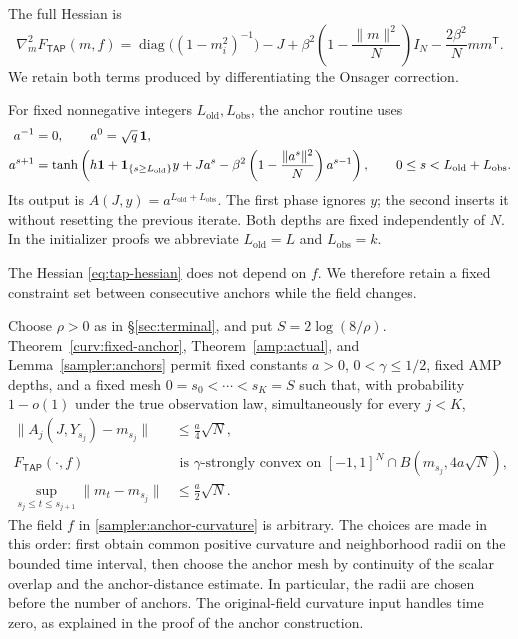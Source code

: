 \documentclass[11pt,reqno]{amsart}
\def\tap{{\mathsf{TAP}}}
\begin{document}
The full Hessian is
\begin{equation}\label{eq:tap-hessian}
 \nabla_m^2 F_{\tap}(m,f)
 =\operatorname{diag}\bigl((1-m_i^2)^{-1}\bigr)-J
  +\beta^2\left(1-\frac{\|m\|^2}{N}\right)I_N
  -\frac{2\beta^2}{N}mm^{\mathsf T}.
\end{equation}
We retain both terms produced by differentiating the Onsager correction.

For fixed nonnegative integers $L_{\mathrm{old}},L_{\mathrm{obs}}$, the anchor routine uses
\begin{equation}\label{amp:two-phase}
\begin{split}
 a^{-1}&=0,\qquad a^0=\sqrt q\,{\boldsymbol{1}},\\
 a^{s+1}&=\tanh\left(h{\boldsymbol{1}}+\mathbf1_{\{s\ge L_{\mathrm{old}}\}}y
 +Ja^s-\beta^2\left(1-\frac{\|a^s\|^2}{N}\right)a^{s-1}\right),
 \qquad 0\le s<L_{\mathrm{old}}+L_{\mathrm{obs}}.
\end{split}
\end{equation}
Its output is $A(J,y)=a^{L_{\mathrm{old}}+L_{\mathrm{obs}}}$. The first phase ignores $y$; the second inserts it without resetting the previous iterate. Both depths are fixed independently of $N$. In the initializer proofs we abbreviate $L_{\mathrm{old}}=L$ and $L_{\mathrm{obs}}=k$.

The Hessian \eqref{eq:tap-hessian} does not depend on $f$. We therefore retain a fixed
constraint set between consecutive anchors while the field changes.

Choose $\rho>0$ as in \S\ref{sec:terminal}, and put
$S=2\log(8/\rho)$. Theorem~\ref{curv:fixed-anchor},
Theorem~\ref{amp:actual}, and Lemma~\ref{sampler:anchors} permit fixed
constants $a>0$, $0<\gamma\le1/2$, fixed AMP depths, and a fixed
mesh $0=s_0<\cdots<s_K=S$ such that, with probability $1-o(1)$ under
the true observation law, simultaneously for every $j<K$,
\begin{align}
 \|A_j(J,Y_{s_j})-m_{s_j}\|&\le\tfrac a4\sqrt N,
       \label{sampler:anchor-accuracy}\\
  F_{\tap}(\cdot,f)&\text{ is $\gamma$-strongly convex on }
       [-1,1]^N\cap B(m_{s_j},4a\sqrt N),
       \label{sampler:anchor-curvature}\\
 \sup_{s_j\le t\le s_{j+1}}\|m_t-m_{s_j}\|
       &\le\tfrac a2\sqrt N.
       \label{sampler:anchor-increments}
\end{align}
The field $f$ in \eqref{sampler:anchor-curvature} is arbitrary.
The choices are made in this order: first obtain common positive
curvature and neighborhood radii on the bounded time interval, then
choose the anchor mesh by continuity of the scalar overlap and the
anchor-distance estimate. In particular, the radii are chosen before
the number of anchors. The original-field curvature input handles
time zero, as explained in the proof of the anchor construction.
\end{document}

